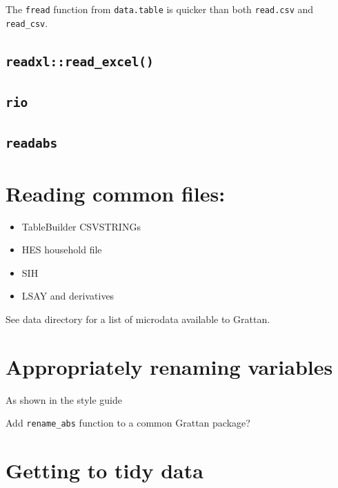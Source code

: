 \documentclass[]{book}
\providecommand{\tightlist}{%
  \setlength{\itemsep}{0pt}\setlength{\parskip}{0pt}}
\begin{document}
The \texttt{fread} function from \texttt{data.table} is quicker than both \texttt{read.csv} and \texttt{read\_csv}.

\hypertarget{readxlread_excel}{%
\subsection{\texorpdfstring{\texttt{readxl::read\_excel()}}{readxl::read\_excel()}}\label{readxlread_excel}}

\hypertarget{rio}{%
\subsection{\texorpdfstring{\texttt{rio}}{rio}}\label{rio}}

\hypertarget{readabs}{%
\subsection{\texorpdfstring{\texttt{readabs}}{readabs}}\label{readabs}}

\hypertarget{reading-common-files}{%
\section{Reading common files:}\label{reading-common-files}}

\begin{itemize}
\tightlist
\item
  TableBuilder CSVSTRINGs
\item
  HES household file
\item
  SIH
\item
  LSAY and derivatives
\end{itemize}

See data directory for a list of microdata available to Grattan.

\hypertarget{appropriately-renaming-variables}{%
\section{Appropriately renaming variables}\label{appropriately-renaming-variables}}

As shown in the style guide

Add \texttt{rename\_abs} function to a common Grattan package?

\hypertarget{getting-to-tidy-data}{%
\section{Getting to tidy data}\label{getting-to-tidy-data}}
\end{document}
